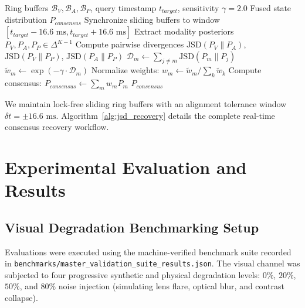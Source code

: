 \documentclass[10pt,journal,compsoc]{IEEEtran}
\begin{document}
\begin{algorithm}[t]
\caption{Dynamic JSD Cross-Modal Consensus Recovery Engine}
\label{alg:jsd_recovery}
\begin{algorithmic}[1]
\REQUIRE Ring buffers $\mathcal{B}_V, \mathcal{B}_A, \mathcal{B}_P$, query timestamp $t_{target}$, sensitivity $\gamma=2.0$
\ENSURE Fused state distribution $P_{consensus}$
\STATE Synchronize sliding buffers to window $[t_{target} - 16.6\text{ ms}, t_{target} + 16.6\text{ ms}]$
\STATE Extract modality posteriors $P_V, P_A, P_P \in \Delta^{K-1}$
\STATE Compute pairwise divergences $\text{JSD}(P_V \parallel P_A)$, $\text{JSD}(P_V \parallel P_P)$, $\text{JSD}(P_A \parallel P_P)$
    \STATE $\mathcal{D}_m \leftarrow \sum_{j \neq m} \text{JSD}(P_m \parallel P_j)$
    \STATE $\tilde{w}_m \leftarrow \exp(-\gamma \cdot \mathcal{D}_m)$
\ENDFOR
\STATE Normalize weights: $w_m \leftarrow \tilde{w}_m / \sum_k \tilde{w}_k$
\STATE Compute consensus: $P_{consensus} \leftarrow \sum_m w_m P_m$
\RETURN $P_{consensus}$
\end{algorithmic}
\end{algorithm}

We maintain lock-free sliding ring buffers with an alignment tolerance window $\delta t = \pm 16.6\text{ ms}$. Algorithm~\ref{alg:jsd_recovery} details the complete real-time consensus recovery workflow.

\section{Experimental Evaluation and Results}

\subsection{Visual Degradation Benchmarking Setup}
Evaluations were executed using the machine-verified benchmark suite recorded in \texttt{benchmarks/master\_validation\_suite\_results.json}. The visual channel was subjected to four progressive synthetic and physical degradation levels: $0\%$, $20\%$, $50\%$, and $80\%$ noise injection (simulating lens flare, optical blur, and contrast collapse).
\end{document}
